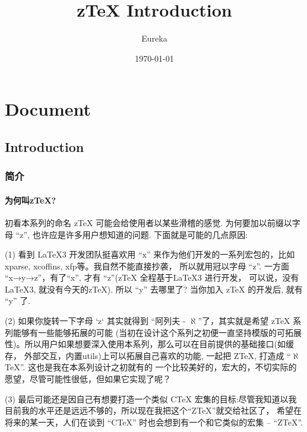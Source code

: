 \documentclass[
  hyper,    
  lang=cn,
  class=book,
  mathSpec={envStyle=leftbar, alias},
  toc={redef}
]{zlatex}
\title{z\TeX{} Introduction}
\author{Eureka}
\date{\today}
\let\cmd\ztexverb
\begin{document}
\maketitle
\frontmatter
\tableofcontents
\mainmatter
\part{Document}
\chapter{Introduction}
\section{简介}
\subsection{为何叫z\TeX{}?}


初看本系列的命名 z\TeX{} 可能会给使用者以某些滑稽的感觉. 为何要加以前缀以字母 ``z'', 也许应是许多用户想知道的问题.
下面就是可能的几点原因:

(1) 看到 \LaTeX3 开发团队挺喜欢用 ``x'' 来作为他们开发的一系列宏包的，比如 xparse, xcoffins, xfp等。我自然不能直接抄袭，
所以就用冠以字母 ``z''. 一方面 ``x→y→z''，有了``x'', 才有 ``z''(z\TeX{} 全程基于\LaTeX3 进行开发，
可以说，没有\LaTeX3, 就没有今天的z\TeX{}). 所以 ``y'' 去哪里了? 当你加入 z\TeX{} 的开发后, 就有 ``y'' 了.

(2) 如果你旋转一下字母 `z` 其实就得到 ``阿列夫 - $\aleph$''了，其实就是希望 z\TeX{} 系列能够有一些能够拓展的可能
(当初在设计这个系列之初便一直坚持模版的可拓展性)。所以用户如果想要深入使用本系列，那么可以在目前提供的基础接口(如缓存，
外部交互，内置utils)上可以拓展自己喜欢的功能, 一起把 Z\TeX{}, 打造成 ``$\aleph$ TeX''. 这也是我在本系列设计之初就有的
一个比较美好的，宏大的，不切实际的愿望，尽管可能性很低，但如果它实现了呢？ 

(3) 最后可能还是因自己有想要打造一个类似 C\TeX{} 宏集的目标:尽管我知道以我目前我的水平还是远远不够的，所以现在我把这个``Z\TeX{}''就交给社区了，
希望在将来的某一天，人们在谈到 ``C\TeX'' 时也会想到有一个和它类似的宏集 -- ``Z\TeX{}''.
\end{document}
